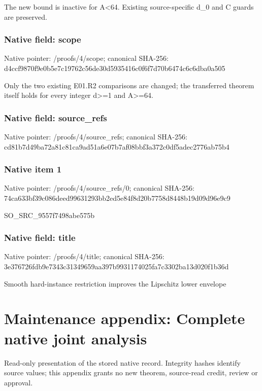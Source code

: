 \documentclass[10pt,a4paper]{article}
\begin{document}
\begingroup\raggedright\sloppy The new bound is inactive for A<64. Existing source-specific d\_\allowbreak{}0 and C guards are preserved.\par\endgroup

\subsubsection{Native field: scope}
Native pointer: /proofs/4/scope; canonical SHA-256: d4ccf9870f9e0b5e7c19762c56de30d5935416c0f6f7d70b6474c6c6dba0a505

\begingroup\raggedright\sloppy Only the two existing E01.R2 comparisons are changed;\allowbreak{} the transferred theorem itself holds for every integer d>=\allowbreak{}1 and A>=\allowbreak{}64.\par\endgroup

\subsubsection{Native field: source\_\allowbreak{}refs}
Native pointer: /proofs/4/source\_\allowbreak{}refs; canonical SHA-256: cd81b7d49ba72a81c81ca9ad51a6e07b7af08bbf3a372c0df5adec2776ab75b4

\subsubsection{Native item 1}
Native pointer: /proofs/4/source\_\allowbreak{}refs/0; canonical SHA-256: 74ca633bf39c086deed99631293bb2ed5e84f8d20b7758d8448b19d09d96e9c9

\begingroup\raggedright\sloppy SO\_\allowbreak{}SRC\_\allowbreak{}9557f7498abe575b\par\endgroup

\subsubsection{Native field: title}
Native pointer: /proofs/4/title; canonical SHA-256: 3e376726fdb9e7343c31349659aa397b9931174025fa7c3302ba13d020f1b36d

\begingroup\raggedright\sloppy Smooth hard-instance restriction improves the Lipschitz lower envelope\par\endgroup

\section{Maintenance appendix: Complete native joint analysis}
Read-only presentation of the stored native record. Integrity hashes identify source values; this appendix grants no new theorem, source-read credit, review or approval.
\end{document}
